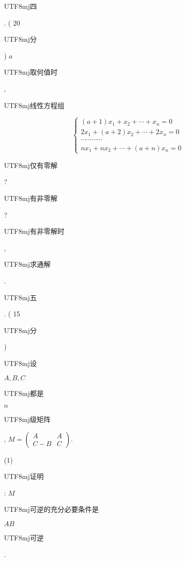\documentclass[10pt]{article}
\begin{document}
\begin{CJK}{UTF8}{mj}四\end{CJK}. ( 20 \begin{CJK}{UTF8}{mj}分\end{CJK}) $a$ \begin{CJK}{UTF8}{mj}取何值时\end{CJK}, \begin{CJK}{UTF8}{mj}线性方程组\end{CJK}
$$
\left\{\begin{array}{c}
(a+1) x_{1}+x_{2}+\cdots+x_{n}=0 \\
2 x_{1}+(a+2) x_{2}+\cdots+2 x_{n}=0 \\
\cdots \cdots \cdots \cdots \\
n x_{1}+n x_{2}+\cdots+(a+n) x_{n}=0
\end{array}\right.
$$
\begin{CJK}{UTF8}{mj}仅有零解\end{CJK}? \begin{CJK}{UTF8}{mj}有非零解\end{CJK}? \begin{CJK}{UTF8}{mj}有非零解时\end{CJK}, \begin{CJK}{UTF8}{mj}求通解\end{CJK}.

\begin{CJK}{UTF8}{mj}五\end{CJK}. ( 15 \begin{CJK}{UTF8}{mj}分\end{CJK}) \begin{CJK}{UTF8}{mj}设\end{CJK} $A, B, C$ \begin{CJK}{UTF8}{mj}都是\end{CJK} $n$ \begin{CJK}{UTF8}{mj}级矩阵\end{CJK}, $M=\left(\begin{array}{cc}A & A \\ C-B & C\end{array}\right)$.

(1) \begin{CJK}{UTF8}{mj}证明\end{CJK}: $M$ \begin{CJK}{UTF8}{mj}可逆的充分必要条件是\end{CJK} $A B$ \begin{CJK}{UTF8}{mj}可逆\end{CJK}.
\end{document}
